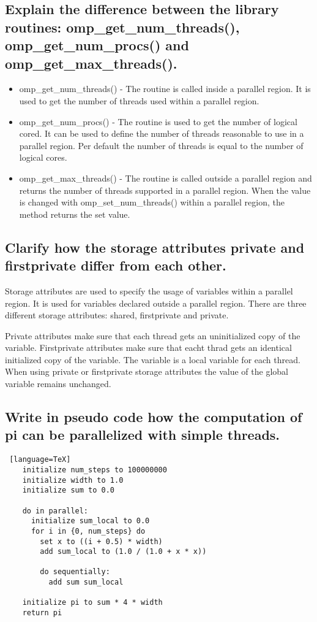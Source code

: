 \documentclass[runningheads]{llncs}
\begin{document}
\subsection{Explain the difference between the library routines: omp\_get\_num\_threads(), omp\_get\_num\_procs() and omp\_get\_max\_threads().}
\begin{itemize}
	\item omp\_get\_num\_threads() - 
	The routine is called inside a parallel region. It is used to get the number of threads used within a parallel region.
	\item omp\_get\_num\_procs() - 
	The routine is used to get the number of logical cored. It can be used to define the number of threads reasonable to use in a parallel region. Per default the number of threads is equal to the number of logical cores.
	\item omp\_get\_max\_threads() - 
	The routine is called outside a parallel region and returns the number of threads supported in a parallel region. When the value is changed with omp\_set\_num\_threads() within a parallel region, the method returns the set value.
\end{itemize}

\subsection{Clarify how the storage attributes private and firstprivate differ from each other.}
Storage attributes are used to specify the usage of variables within a parallel region. It is used for variables declared outside a parallel region.
There are three different storage attributes: shared, firstprivate and private.

Private attributes make sure that each thread gets an uninitialized copy of the variable.
Firstprivate attributes make sure that eacht thrad gets an identical initialized copy of the variable. The variable is a local variable for each thread.
When using private or firstprivate storage attributes the value of the global variable remains unchanged.

\subsection{Write in pseudo code how the computation of pi can be parallelized with simple threads.}
\begin{lstlisting} [language=TeX]
	initialize num_steps to 100000000
	initialize width to 1.0
	initialize sum to 0.0

	do in parallel:
	  initialize sum_local to 0.0
	  for i in {0, num_steps} do
	    set x to ((i + 0.5) * width)
		add sum_local to (1.0 / (1.0 + x * x))
		
		do sequentially:
		  add sum sum_local
	
	initialize pi to sum * 4 * width
	return pi


\end{lstlisting}
\end{document}
